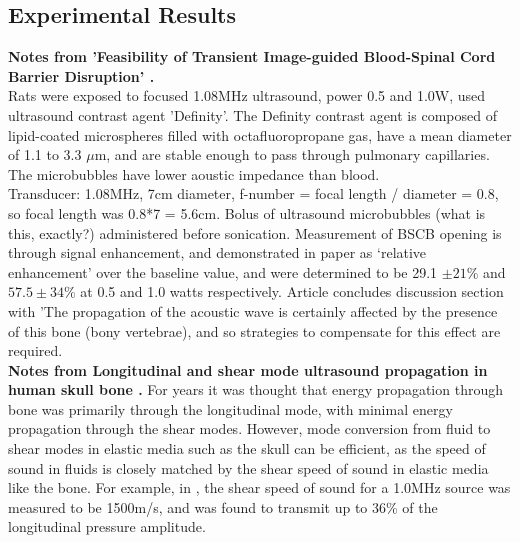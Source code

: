 \documentclass[11pt,titlepage]{article} %
\begin{document}
\subsection{Experimental Results}

\textbf{Notes from 'Feasibility of Transient Image-guided Blood-Spinal Cord Barrier Disruption' \cite{wachsmuth2009feasibility}.}\\
Rats were exposed to focused 1.08MHz ultrasound, power 0.5 and 1.0W, used ultrasound contrast agent 'Definity'. The Definity contrast agent is composed of lipid-coated microspheres filled with octafluoropropane gas, have a mean diameter of 1.1 to 3.3 $\mu$m, and are stable enough to pass through pulmonary capillaries. The microbubbles have lower aoustic impedance than blood. \\
Transducer: 1.08MHz, 7cm diameter, f-number = focal length / diameter = 0.8, so focal length was 0.8*7 = 5.6cm. Bolus of ultrasound microbubbles (what is this, exactly?) administered before sonication. Measurement of BSCB opening is through signal enhancement, and demonstrated in paper as `relative enhancement' over the baseline value, and were determined to be 29.1 $\pm 21\%$ and $57.5 \pm 34\%$ at 0.5 and 1.0 watts respectively. Article concludes discussion section with 'The propagation of the acoustic wave is certainly affected by the presence of this bone (bony vertebrae), and so strategies to compensate for this effect are required.\\


\textbf{Notes from Longitudinal and shear mode ultrasound propagation in human skull bone \cite{white2006longitudinal}.}
For years it was thought that energy propagation through bone was primarily through the longitudinal mode, with minimal energy propagation through the shear modes. However, mode conversion from fluid to shear modes in elastic media such as the skull can be efficient, as the speed of sound in fluids is closely matched by the shear speed of sound in elastic media like the bone. For example, in \cite{white2006longitudinal}, the shear speed of sound for a 1.0MHz source was measured to be 1500m/s, and was found to transmit up to 36$\%$ of the longitudinal pressure amplitude.  
\end{document}
